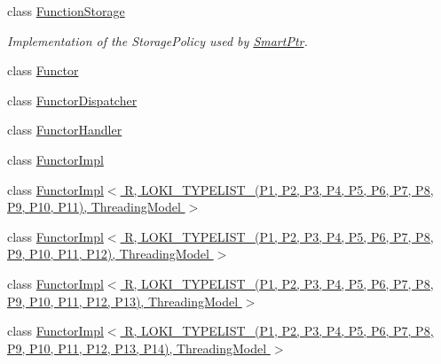 \begin{DoxyCompactItemize}
\item 
class \hyperlink{classLoki_1_1FunctionStorage}{Function\+Storage}
\begin{DoxyCompactList}\small\item\em Implementation of the Storage\+Policy used by \hyperlink{classLoki_1_1SmartPtr}{Smart\+Ptr}. \end{DoxyCompactList}\item 
class \hyperlink{classLoki_1_1Functor}{Functor}
\item 
class \hyperlink{classLoki_1_1FunctorDispatcher}{Functor\+Dispatcher}
\item 
class \hyperlink{classLoki_1_1FunctorHandler}{Functor\+Handler}
\item 
class \hyperlink{classLoki_1_1FunctorImpl}{Functor\+Impl}
\item 
class \hyperlink{classLoki_1_1FunctorImpl_3_01R_00_01_01_01_01_01_01_01_01_01_01_01_01_01_01_01_01_01_01_01_01_012cc17e10e293e3d42873c3bf9f251a40}{Functor\+Impl$<$ R,                                                                           L\+O\+K\+I\+\_\+\+T\+Y\+P\+E\+L\+I\+S\+T\+\_(\+P1, P2, P3, P4, P5, P6, P7, P8, P9, P10, P11),                                                                           Threading\+Model $>$}
\item 
class \hyperlink{classLoki_1_1FunctorImpl_3_01R_00_01_01_01_01_01_01_01_01_01_01_01_01_01_01_01_01_01_01_01_01_017c788c46fcb2e521ccdf7053452b5922}{Functor\+Impl$<$ R,                                                                           L\+O\+K\+I\+\_\+\+T\+Y\+P\+E\+L\+I\+S\+T\+\_(\+P1, P2, P3, P4, P5, P6, P7, P8, P9, P10, P11, P12),                                                                           Threading\+Model $>$}
\item 
class \hyperlink{classLoki_1_1FunctorImpl_3_01R_00_01_01_01_01_01_01_01_01_01_01_01_01_01_01_01_01_01_01_01_01_01a61bd4e4c12f56d6be0c2d19e011aa2f}{Functor\+Impl$<$ R,                                                                           L\+O\+K\+I\+\_\+\+T\+Y\+P\+E\+L\+I\+S\+T\+\_(\+P1, P2, P3, P4, P5, P6, P7, P8, P9, P10, P11, P12, P13),                                                                           Threading\+Model $>$}
\item 
class \hyperlink{classLoki_1_1FunctorImpl_3_01R_00_01_01_01_01_01_01_01_01_01_01_01_01_01_01_01_01_01_01_01_01_01ae97c0dda0b09cac4a281c5ef95111da}{Functor\+Impl$<$ R,                                                                           L\+O\+K\+I\+\_\+\+T\+Y\+P\+E\+L\+I\+S\+T\+\_(\+P1, P2, P3, P4, P5, P6, P7, P8, P9, P10, P11, P12, P13,                                                                                                           P14),                                                                           Threading\+Model $>$}

\end{DoxyCompactItemize}
